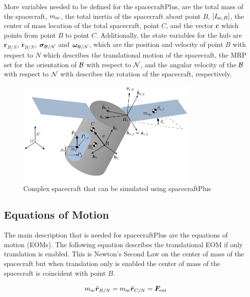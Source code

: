 More variables needed to be defined for the spacecraftPlus, are the total mass of the spacecraft, $m_{\textnormal{sc}}$, the total inertia of the spacecraft about point $B$,  $[I_{\textnormal{sc},B}]$, the center of mass location of the total spacecraft, point $C$, and the vector $\bm c$ which points from point $B$ to point $C$. Additionally, the state variables for the hub are $\bm r_{B/N}$, $\dot{\bm r}_{B/N}$, $\bm \sigma_{\cal{B}/\cal{N}}$ and $\bm \omega_{\cal{B}/\cal{N}}$, which are the position and velocity of point $B$ with respect to $N$ which describes the translational motion of the spacecraft, the MRP set for the orientation of $\cal{B}$ with respect to $\cal{N}$, and the angular velocity of the $\cal{B}$ with respect to $\cal{N}$ with describes the rotation of the spacecraft, respectively. 


\begin{figure}[htbp]
	\centerline{
		\includegraphics[width=0.8\textwidth]{Figures/Flex_Slosh_Figure}}
	\caption{Complex spacecraft that can be simulated using spacecraftPlus}
	\label{fig:FlexSloshFigure}
\end{figure}

\subsection{Equations of Motion}

The main description that is needed for spacecraftPlus are the equations of motion (EOMs). The following equation describes the translational EOM if only translation is enabled. This is Newton's Second Law on the center of mass of the spacecraft but when translation only is enabled the center of mass of the spacecraft is coincident with point $B$. 

\begin{equation}
m_{\text{sc}} \ddot{\bm r}_{B/N} = m_{\text{sc}} \ddot{\bm r}_{C/N} =  \bm F_{\textnormal{ext}}
\label{eq:Rbddot3}
\end{equation}

